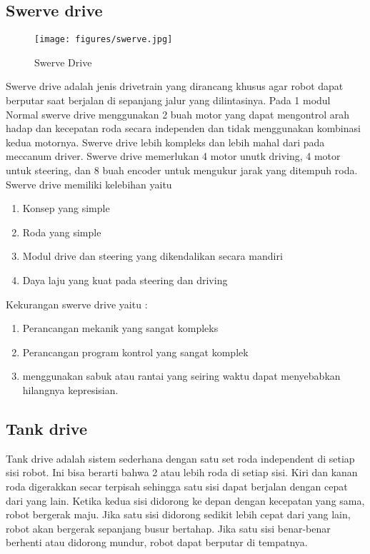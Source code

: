 \subsection{Swerve drive }    \begin{figure}[!htb]
 \centering
\texttt{[image: figures/swerve.jpg]}
 \caption{Swerve Drive}
 \label{fig:swerve}
\end{figure}
Swerve drive adalah jenis drivetrain yang dirancang khusus agar robot dapat berputar saat berjalan di sepanjang jalur yang dilintasinya. Pada 1 modul Normal swerve drive menggunakan 2 buah motor yang dapat mengontrol arah hadap dan kecepatan roda secara independen dan tidak menggunakan kombinasi kedua motornya. Swerve drive lebih kompleks dan lebih mahal dari pada meccanum driver. Swerve drive memerlukan 4 motor unutk driving, 4 motor untuk steering, dan 8 buah encoder untuk mengukur jarak yang ditempuh roda. Swerve drive memiliki kelebihan yaitu
    \begin{enumerate}
        \item Konsep yang simple
        \item Roda yang simple 
        \item Modul drive dan steering yang dikendalikan secara mandiri
        \item Daya laju yang kuat pada steering dan driving
    \end{enumerate}
Kekurangan swerve drive yaitu : 
    \begin{enumerate}
        \item Perancangan mekanik yang sangat kompleks
        \item Perancangan program kontrol yang sangat komplek
        \item menggunakan sabuk atau rantai yang seiring waktu dapat menyebabkan hilangnya kepresisian.
    \end{enumerate}

\subsection{Tank drive}
Tank drive adalah sistem sederhana dengan satu set roda independent di setiap sisi robot. Ini bisa berarti bahwa 2 atau lebih roda di setiap sisi. Kiri dan kanan roda digerakkan secar terpisah sehingga satu sisi dapat berjalan dengan cepat dari yang lain. Ketika kedua sisi didorong ke depan dengan kecepatan yang sama, robot bergerak maju. Jika satu sisi didorong sedikit lebih cepat dari yang lain, robot akan bergerak sepanjang busur bertahap. Jika satu sisi benar-benar berhenti atau didorong mundur, robot dapat berputar di tempatnya.


